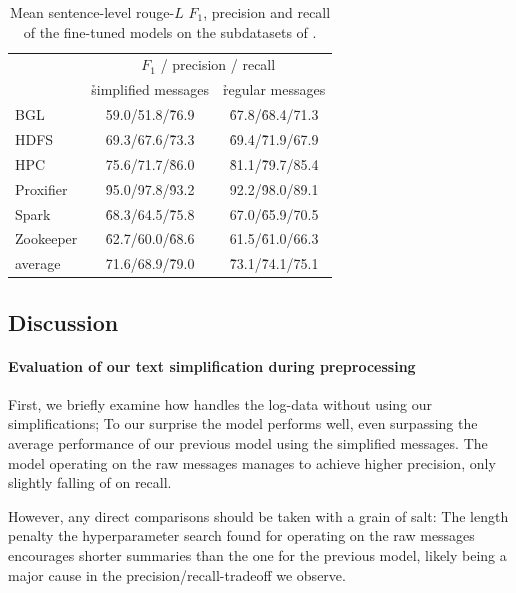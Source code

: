 \begin{table}[htbp]
\centering
\footnotesize
\begin{tabular}{l@{\qquad}c@{\qquad}c}
                    & \multicolumn{2}{c}{\scriptsize{}\(F_1\) / precision / recall}\\
                    & \h{simplified messages} & \h{regular messages}\\
\midrule
BGL                 & 59.0/51.8/\h{76.9}      & \h{67.8}/\h{68.4}/71.3\\
HDFS                & 69.3/67.6/\h{73.3}      & \h{69.4}/\h{71.9}/67.9\\
HPC                 & 75.6/71.7/\h{86.0}      & \h{81.1}/\h{79.7}/85.4\\
Proxifier           & \h{95.0}/97.8/\h{93.2}  & 92.2/\h{98.0}/89.1\\
Spark               & \h{68.3}/64.5/\h{75.8}  & 67.0/\h{65.9}/70.5\\
Zookeeper           & \h{62.7}/60.0/\h{68.6}  & 61.5/\h{61.0}/66.3\\
\midrule
average             & 71.6/68.9/\h{79.0}      & \h{73.1}/\h{74.1}/75.1\\
\bottomrule
\end{tabular}
\caption{Mean sentence-level \acs*{rouge}-\(L\) \(F_1\), precision and recall of the fine-tuned  models on the subdatasets of \logsummary{}.}
\label{tab:comparison_preprocessing_logsummary}
\end{table}

\subsection{Discussion}

\paragraph{Evaluation of our text simplification during preprocessing}

First, we briefly examine how  handles the log-data without using our simplifications;
To our surprise the model performs well, even surpassing the average performance of our previous  model using the simplified messages.
The model operating on the raw messages manages to achieve higher precision, only slightly falling of on recall.

However, any direct comparisons should be taken with a grain of salt:
The length penalty the hyperparameter search found for  operating on the raw messages encourages shorter summaries than the one for the previous model,
likely being a major cause in the precision/recall-tradeoff we observe.

